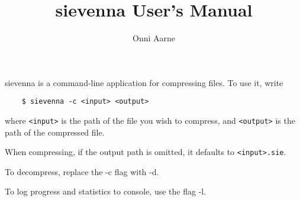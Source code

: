 \documentclass[11pt,a4paper,oneside,notitlepage,final]{article}
\begin{document}
	
	\setlength{\abovedisplayskip}{8.0pt plus3.0pt minus4.0pt}
	\setlength{\abovedisplayshortskip}{0.0pt plus3.0pt}
	\setlength{\belowdisplayskip}{8.0pt plus3.0pt minus4.0pt}
	\setlength{\belowdisplayshortskip}{7.0pt plus3.0pt minus3.0pt}
	
	\title{sievenna User's Manual}
	\author{Onni Aarne}
	\maketitle
	
	sievenna is a command-line application for compressing files. To use it, write
	\begin{lstlisting}
	$ sievenna -c <input> <output>
	\end{lstlisting}
	where \texttt{<input>} is the path of the file you wish to compress, and \texttt{<output>} is the path of the compressed file.
	
	When compressing, if the output path is omitted, it defaults to \texttt{<input>.sie}.
	
	To decompress, replace the -c flag with -d.
	
	To log progress and statistics to console, use the flag -l.
\end{document}
